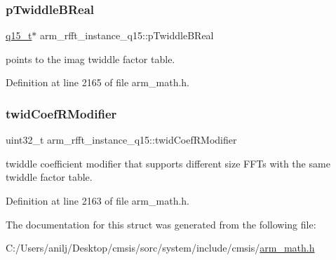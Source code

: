 \subsubsection{\texorpdfstring{p\+Twiddle\+B\+Real}{pTwiddleBReal}}
{\footnotesize\ttfamily \hyperlink{arm__math_8h_ab5a8fb21a5b3b983d5f54f31614052ea}{q15\+\_\+t}$\ast$ arm\+\_\+rfft\+\_\+instance\+\_\+q15\+::p\+Twiddle\+B\+Real}

points to the imag twiddle factor table. 

Definition at line 2165 of file arm\+\_\+math.\+h.

\mbox{\label{structarm__rfft__instance__q15_afd444d05858c5f419980e94e8240d5c3}} 
\subsubsection{\texorpdfstring{twid\+Coef\+R\+Modifier}{twidCoefRModifier}}
{\footnotesize\ttfamily uint32\+\_\+t arm\+\_\+rfft\+\_\+instance\+\_\+q15\+::twid\+Coef\+R\+Modifier}

twiddle coefficient modifier that supports different size F\+F\+Ts with the same twiddle factor table. 

Definition at line 2163 of file arm\+\_\+math.\+h.



The documentation for this struct was generated from the following file\+:\begin{DoxyCompactItemize}
\item 
C\+:/\+Users/anilj/\+Desktop/cmsis/sorc/system/include/cmsis/\hyperlink{arm__math_8h}{arm\+\_\+math.\+h}\end{DoxyCompactItemize}

